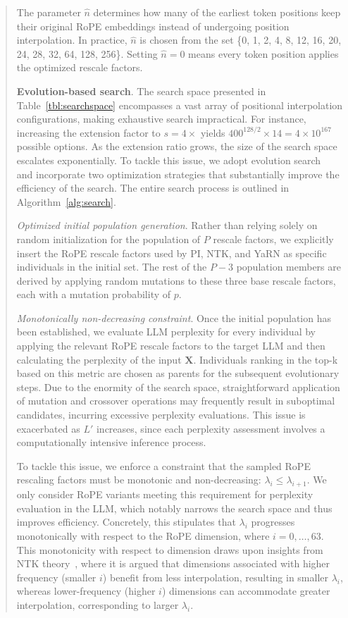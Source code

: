 \begin{abstract}
The parameter $\hat{n}$ determines how many of the earliest token positions keep their original RoPE embeddings instead of undergoing position interpolation. In practice, $\hat{n}$ is chosen from the set \{0, 1, 2, 4, 8, 12, 16, 20, 24, 28, 32, 64, 128, 256\}. Setting $\hat{n}=0$ means every token position applies the optimized rescale factors.

\textbf{Evolution-based search}. The search space presented in Table~\ref{tbl:searchspace} encompasses a vast array of positional interpolation configurations, making exhaustive search impractical. For instance, increasing the extension factor to $s=4\times$ yields $400^{128/2}\times14=4\times10^{167}$ possible options. As the extension ratio grows, the size of the search space escalates exponentially. To tackle this issue, we adopt evolution search~\cite{guo2020single} and incorporate two optimization strategies that substantially improve the efficiency of the search. The entire search process is outlined in Algorithm~\ref{alg:search}.

\textit{Optimized initial population generation}. Rather than relying solely on random initialization for the population of $P$ rescale factors, we explicitly insert the RoPE rescale factors used by PI, NTK, and YaRN as specific individuals in the initial set. The rest of the $P-3$ population members are derived by applying random mutations to these three base rescale factors, each with a mutation probability of $p$.

\textit{Monotonically non-decreasing constraint}. Once the initial population has been established, we evaluate LLM perplexity for every individual by applying the relevant RoPE rescale factors to the target LLM and then calculating the perplexity of the input $\mathbf{X}$. Individuals ranking in the top-k based on this metric are chosen as parents for the subsequent evolutionary steps. Due to the enormity of the search space, straightforward application of mutation and crossover operations may frequently result in suboptimal candidates, incurring excessive perplexity evaluations. This issue is exacerbated as $L'$ increases, since each perplexity assessment involves a computationally intensive inference process.

To tackle this issue, we enforce a constraint that the sampled RoPE rescaling factors must be monotonic and non-decreasing: $\lambda_i \le \lambda_{i+1}$. We only consider RoPE variants meeting this requirement for perplexity evaluation in the LLM, which notably narrows the search space and thus improves efficiency. Concretely, this stipulates that $\lambda_i$ progresses monotonically with respect to the RoPE dimension, where $i = 0, \ldots, 63$. This monotonicity with respect to dimension draws upon insights from NTK theory~\cite{jacot2018neural,tancik2020fourier,ntk}, where it is argued that dimensions associated with higher frequency (smaller $i$) benefit from less interpolation, resulting in smaller $\lambda_i$, whereas lower-frequency (higher $i$) dimensions can accommodate greater interpolation, corresponding to larger $\lambda_i$.


\end{abstract}
